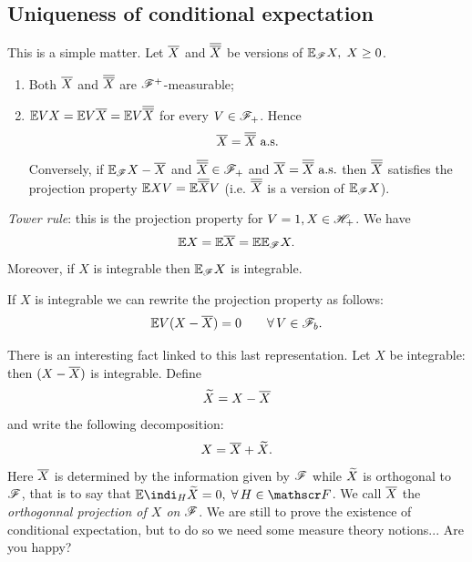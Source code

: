 \documentclass{report}
\begin{document}
\subsection{Uniqueness of conditional expectation}
This is a simple matter. Let $\overline{X}$ and $\overline{\overline{X}}$ be versions of $\mathbb{E}_{\mathscr{F}}X,\;X\geq 0$.
\begin{enumerate}
	\item Both $\overline{X}$ and $\overline{\overline{X}}$ are $\mathscr{F}^{+}$-measurable;
	\item $\mathbb{E} VX=\mathbb{E} V\overline{X}=\mathbb{E} V\overline{\overline{X}}$ for every $V\in\mathscr{F}_{+}$. Hence 
	\[\overline{X}=\overline{\overline{X}}\text{ a.s.}\]
	Conversely, if $\mathbb{E}_{\mathscr{F}}X-\overline{X}$ and $\overline{\overline{X}}\in\mathscr{F}_+$ and $\overline{X}=\overline{\overline{X}}\text{ a.s.}$ then $\overline{\overline{X}}$ satisfies the projection property $\mathbb{E} XV=\mathbb{E}\overline{\overline{X}} V$ (i.e. $\overline{\overline{X}}$ is a version of $\mathbb{E}_{\mathscr{F}} X$).
\end{enumerate}
\begin{remark}
	\emph{Tower rule}: this is the projection property for $V=1, X\in\mathscr{H}_{+}$. We have
	\[\mathbb{E} X=\mathbb{E}\overline{X}=\mathbb{E}\mathbb{E}_{\mathscr{F}} X.\]
	Moreover, if $X$ is integrable then $\mathbb{E}_{\mathscr{F}} X$ is integrable.
\end{remark}
\begin{remark}
	If $X$ is integrable we can rewrite the projection property as follows:
	\begin{equation*}
		\mathbb{E} V(X-\overline{X})=0\qquad\forall\, V\in\mathscr{F}_b.
	\end{equation*}
\end{remark}
There is an interesting fact linked to this last representation. Let $X$ be integrable: then $(X-\overline{X})$ is integrable. Define
\[\widetilde{X}=X-\overline{X}\]
and write the following decomposition:
\[X=\overline{X}+\widetilde{X}.\]
Here $\overline{X}$ is determined by the information given by $\mathscr{F}$ while $\widetilde{X}$ is orthogonal to $\mathscr{F}$, that is to say that $\ev\indi_H\xtilde=0,\;\every H\in\F$. We call $\overline{X}$ the \emph{orthogonnal projection of $X$ on $\mathscr{F}$}.
We are still to prove the existence of conditional expectation, but to do so we need some measure theory notions... Are you happy?
\end{document}
